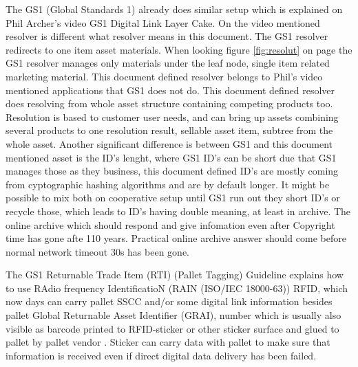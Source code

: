 The GS1 (Global Standards 1) already does similar setup which is explained on
Phil Archer's video GS1 Digital Link Layer Cake\cite{GS1DigitalLink}. On the
video mentioned resolver is different what resolver means in this document.
The GS1 resolver redirects to one item asset materials. When looking figure
\ref{fig:resolut} on page \pageref{fig:resolut} the GS1 resolver manages only
materials under the leaf node, single item related marketing material. This
document defined resolver belongs to Phil's video mentioned applications that
GS1 does not do. This document defined resolver does resolving from whole
asset structure containing competing products too. Resolution is based to
customer user needs, and  can bring up assets combining several products to one
resolution result, sellable asset item, subtree from the whole asset. Another
significant difference is between GS1 and this document mentioned asset is the
ID's lenght, where GS1 ID's can be short due that GS1 manages those as they
business, this document defined ID's are mostly coming from cyptographic
hashing algorithms\cite{CompHashFunc} and are by default longer.
It might be possible to mix both on cooperative setup until GS1 run out they
short ID's or recycle those, which leads to ID's having double meaning, at
least in archive. The online archive which should respond and give infomation
even after Copyright time \cite{CopyrightLengths} has gone afte 110 years.
Practical online archive answer should come before normal network timeout 30s
has been gone. %

The GS1 Returnable Trade Item (RTI) (Pallet Tagging) Guideline\cite{RTIguideline}
explains how to use RAdio frequency IdentificatioN (RAIN (ISO/IEC 18000-63))
RFID\cite{UHFforRAIN}, which now days can carry pallet SSCC and/or some digital
link information besides pallet Global Returnable Asset Identifier (GRAI),
number which is usually also visible as barcode printed to RFID-sticker
or other sticker surface and glued to pallet by pallet vendor
\cite{EPalIPal}\cite{AllGreenPallets}\cite{iGpsRFID}\cite{SRSpallets}\cite{CramerRFIDoption}\cite{ChepIcoQube}.
Sticker can carry data with pallet to make sure that information
is received even if direct digital data delivery has been failed.

